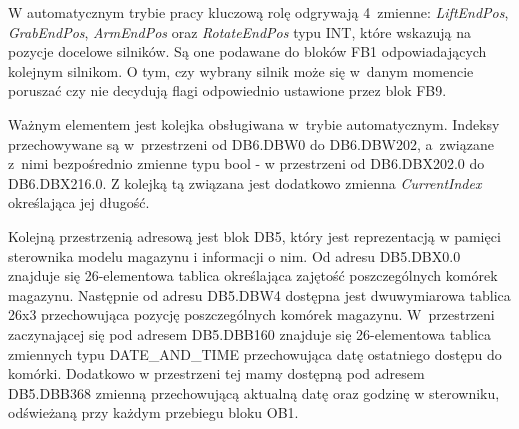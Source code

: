 W automatycznym trybie pracy kluczową rolę odgrywają 4~zmienne: \emph{LiftEndPos}, \emph{GrabEndPos}, \emph{ArmEndPos} oraz \emph{RotateEndPos} typu INT, które wskazują na pozycje docelowe silników. Są one podawane do bloków FB1 odpowiadających kolejnym silnikom. O tym, czy wybrany silnik może się w~danym momencie poruszać czy nie decydują flagi odpowiednio ustawione przez blok FB9. 

Ważnym elementem jest kolejka obsługiwana w~trybie automatycznym. Indeksy przechowywane są w~przestrzeni od DB6.DBW0 do DB6.DBW202, a~związane z~nimi bezpośrednio zmienne typu bool - w przestrzeni od DB6.DBX202.0 do DB6.DBX216.0. Z kolejką tą związana jest dodatkowo zmienna \emph{CurrentIndex} określająca jej długość.

Kolejną przestrzenią adresową jest blok DB5, który jest reprezentacją w pamięci sterownika modelu magazynu i informacji o nim. Od adresu DB5.DBX0.0 znajduje się 26-elementowa tablica określająca zajętość poszczególnych komórek magazynu. Następnie od adresu DB5.DBW4 dostępna jest dwuwymiarowa tablica 26x3 przechowująca pozycję poszczególnych komórek magazynu. W~przestrzeni zaczynającej się pod adresem DB5.DBB160 znajduje się 26-elementowa tablica zmiennych typu DATE\_AND\_TIME przechowująca datę ostatniego dostępu do komórki. Dodatkowo w przestrzeni tej mamy dostępną pod adresem DB5.DBB368 zmienną przechowującą aktualną datę oraz godzinę w sterowniku, odświeżaną przy każdym przebiegu bloku OB1.


